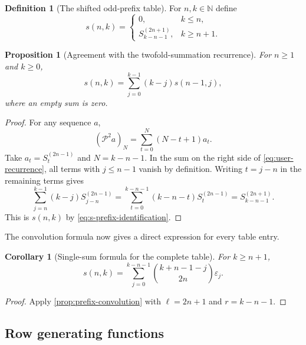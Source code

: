 \documentclass[11pt,oneside]{article}
\newtheorem{proposition}[theorem]{Proposition}
\newtheorem{corollary}[theorem]{Corollary}
\theoremstyle{definition}
\newtheorem{definition}[theorem]{Definition}
\theoremstyle{remark}
\newcommand{\N}{\mathbb N}
\newcommand{\eps}{\varepsilon}
\newcommand{\Prefix}{\mathcal P}
\begin{document}
\begin{definition}[The shifted odd-prefix table]
\label{def:s-table}
For $n,k\in\N$ define
\begin{equation}
 s(n,k)=
 \begin{cases}
  0,&k\le n,\\[0.25em]
  S^{(2n+1)}_{k-n-1},&k\ge n+1.
 \end{cases}
 \label{eq:s-prefix-identification}
\end{equation}
\end{definition}

\begin{proposition}[Agreement with the twofold-summation recurrence]
\label{prop:user-recurrence}
For $n\ge1$ and $k\ge0$,
\begin{equation}
 s(n,k)=\sum_{j=0}^{k-1}(k-j)s(n-1,j),
 \label{eq:user-recurrence}
\end{equation}
where an empty sum is zero.
\end{proposition}

\begin{proof}
For any sequence $a$,
\[
 (\Prefix^2a)_N
   =\sum_{t=0}^{N}(N-t+1)a_t.
\]
Take $a_t=S^{(2n-1)}_t$ and $N=k-n-1$.  In the sum on the right side of
\eqref{eq:user-recurrence}, all terms with $j\le n-1$ vanish by definition.
Writing $t=j-n$ in the remaining terms gives
\[
 \sum_{j=n}^{k-1}(k-j)S^{(2n-1)}_{j-n}
 =\sum_{t=0}^{k-n-1}(k-n-t)S^{(2n-1)}_t
 =S^{(2n+1)}_{k-n-1}.
\]
This is $s(n,k)$ by \eqref{eq:s-prefix-identification}.
\end{proof}

The convolution formula now gives a direct expression for every table entry.

\begin{corollary}[Single-sum formula for the complete table]
\label{cor:s-direct}
For $k\ge n+1$,
\begin{equation}
 s(n,k)=\sum_{j=0}^{k-n-1}
   \binom{k+n-1-j}{2n}\eps_j.
 \label{eq:s-direct}
\end{equation}
\end{corollary}

\begin{proof}
Apply \cref{prop:prefix-convolution} with $\ell=2n+1$ and
$r=k-n-1$.
\end{proof}

\subsection{Row generating functions}
\end{document}

